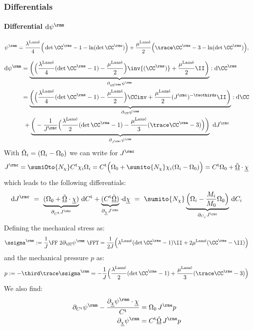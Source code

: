 \subsubsection{Differentials} \label{app:derivatives}

\paragraph{Differential $\rmd\psim$}
\begin{align}
  \psim = \frac{\lambda^{\text{Lam\'e}}}{4}\Big(\det\CCe-1-\ln(\det\CCe)\Big) + \frac{\mu^{\text{Lam\'e}}}{2}\Big(\trace\CCe-3-\ln(\det\CCe)\Big),
\end{align}

\begin{align}
  \rmd\psim &= \underbrace{\bigg(\Big(\frac{\lambda^{\text{Lam\'e}}}{4}(\det\CCe-1)-\frac{\mu^{\text{Lam\'e}}}{2}\Big) \inv{(\CCe)} + \frac{\mu^{\text{Lam\'e}}}{2}\II\bigg)}_{\partial_{\CCe}\psim} : \rmd\CCe \\
  &= \underbrace{\bigg(\Big(\frac{\lambda^{\text{Lam\'e}}}{4}(\det\CCe-1)-\frac{\mu^{\text{Lam\'e}}}{2}\Big) \CCinv + \frac{\mu^{\text{Lam\'e}}}{2}(\Jc)^{-\twothirds}\II\bigg)}_{\dCC\psim}:\rmd\CC \\
  & \ + \underbrace{\bigg(-\frac{1}{\Jc}\Big(\frac{\lambda^{\text{Lam\'e}}}{2}(\det\CCe-1)-\frac{\mu^{\text{Lam\'e}}}{3}(\trace\CCe-3)\Big)\bigg)}_{\dJc\psim} \ \rmd \Jc
\end{align}
With $\smash{\tilde{\Omega}}_i=(\Omega_i-\Omega_0)$ we can write for $\Jc$ 
\begin{align}
  \Jc = \sumiOto{\Nchi} \Ct\chi_i\Omeganordi = \Ct \Big( \Omeganord_0 + \sumito{\Nchi} \chii (\Omeganordi-\Omeganord_0) \Big) = \Ct \Omeganord_0 + \Omeganordultilde\cdot\chiul
\end{align}
which leads to the following differentials:
\begin{align}
  \rmd\Jc \ = \  \underbrace{(\Omeganord_0 + \Omeganordultilde\cdot\chiul)}_{\dCt\Jc} \, \rmd\Ct 
            + \underbrace{(\Ct\Omeganordultilde)}_{\dchiul\Jc}\cdot\rmd\chiul 
          \ = \ \sumito{\Nchi}\underbrace{\Big(\Omeganord_i - \frac{M_i}{M_0}\Omeganord_0\Big)}_{\dCi\Jc} \, \rmd C_i
\end{align}
Defining the mechanical stress as:
\begin{align}
  \ssigma^\rmm := \frac{1}{J}\FF\ 2\dCC\psim\ \FFT = \frac{1}{2J}\Big(\lambda^{\text{Lam\'e}}(\det\CCe-1)\II + 2\mu^{\text{Lam\'e}}(\CCe-\II)\Big)
\end{align}
and the mechanical pressure $p$ as:
\begin{align}
  p := -\third\trace\ssigma^\rmm = -\frac{1}{J}\Big(\frac{\lambda^{\text{Lam\'e}}}{2}(\det\CCe-1)+\frac{\mu^{\text{Lam\'e}}}{3}(\trace\CCe-3)\Big)
\end{align}
We also find:
\begin{align}
  \dCt\psim - \frac{\dchiul\psim \cdot \chiul}{\Ct} &= \Omeganord_0 \,\Je p \\
  \dchiul\psim &= \Ct \Omeganordultilde \, \Je p
\end{align}

